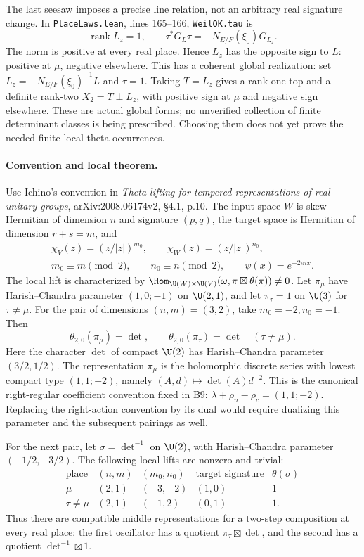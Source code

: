 \documentclass[11pt]{article}
\theoremstyle{definition}\newtheorem{definition}[theorem]{Definition}\newtheorem{remark}[theorem]{Remark}
\begin{document}
The last seesaw imposes a precise line relation, not an arbitrary real signature change. In \texttt{PlaceLaws.lean}, lines 165--166, \texttt{WeilOK.tau} is
\[
 \operatorname{rank}L_z=1,\qquad
 \tau^*G_L\tau=-N_{E/F}(\xi_0)G_{L_z}.
 \tag{B15b}
\]
The norm is positive at every real place. Hence $L_z$ has the opposite sign to $L$: positive at $\mu$, negative elsewhere. This has a coherent global realization: set $L_z=-N_{E/F}(\xi_0)^{-1}L$ and $\tau=1$. Taking $T=L_z$ gives a rank-one top and a definite rank-two $X_2=T\perp L_z$, with positive sign at $\mu$ and negative sign elsewhere. These are actual global forms; no unverified collection of finite determinant classes is being prescribed. Choosing them does not yet prove the needed finite local theta occurrences.

\paragraph{Convention and local theorem.}
Use Ichino's convention in \emph{Theta lifting for tempered representations of real unitary groups}, arXiv:2008.06174v2, \S4.1, p.10. The input space $W$ is skew-Hermitian of dimension $n$ and signature $(p,q)$, the target space is Hermitian of dimension $r+s=m$, and
\begin{equation}
\begin{gathered}
 \chi_V(z)=(z/|z|)^{m_0},\qquad
 \chi_W(z)=(z/|z|)^{n_0},\\
 m_0\equiv m\pmod2,\qquad n_0\equiv n\pmod2,
 \qquad \psi(x)=e^{-2\pi i x}.
\end{gathered}
 \tag{B15c}
\end{equation}
The local lift is characterized by
$\Hom_{\U(W)\times\U(V)}(\omega,\pi\boxtimes\theta(\pi))\ne0$.
Let $\pi_\mu$ have Harish--Chandra parameter $(1,0;-1)$ on $\U(2,1)$, and let $\pi_\tau=1$ on $\U(3)$ for $\tau\ne\mu$. For the pair of dimensions $(n,m)=(3,2)$, take $m_0=-2,n_0=-1$. Then
\[
 \theta_{2,0}(\pi_\mu)=\det,\qquad
 \theta_{2,0}(\pi_\tau)=\det\quad(\tau\ne\mu).
 \tag{B15d}
\]
Here the character $\det$ of compact $\U(2)$ has Harish--Chandra parameter $(3/2,1/2)$.
The representation $\pi_\mu$ is the holomorphic discrete series with lowest compact type $(1,1;-2)$, namely $(A,d)\mapsto\det(A)d^{-2}$. This is the canonical right-regular coefficient convention fixed in B9: $\lambda+\rho_n-\rho_c=(1,1;-2)$. Replacing the right-action convention by its dual would require dualizing this parameter and the subsequent pairings as well.

For the next pair, let $\sigma=\det^{-1}$ on $\U(2)$, with Harish--Chandra parameter $(-1/2,-3/2)$. The following local lifts are nonzero and trivial:
\[
\begin{array}{c|c|c|c|c}
\text{place}&(n,m)&(m_0,n_0)&\text{target signature}&\theta(\sigma)\\ \hline
\mu&(2,1)&(-3,-2)&(1,0)&1\\
\tau\ne\mu&(2,1)&(-1,2)&(0,1)&1.
\end{array}
 \tag{B15e}
\]
Thus there are compatible middle representations for a two-step composition at every real place: the first oscillator has a quotient $\pi_\tau\boxtimes\det$, and the second has a quotient $\det^{-1}\boxtimes1$.
\end{document}

